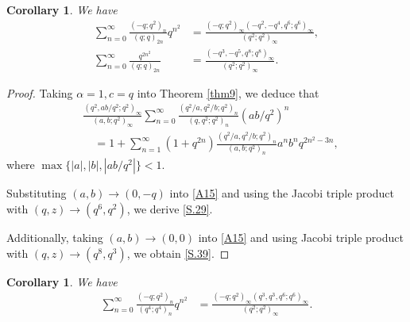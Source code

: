 \documentclass[reqno,12pt]{amsart}
\newtheorem{corollary}[theorem]{Corollary}
\theoremstyle{remark}
\numberwithin{equation}{section}
\begin{document}
\begin{corollary}
We have
\begin{align}
\sum_{n=0}^{\infty}\frac{\left(-q;q^2\right)_n}{\left(q;q\right)_{2n}}q^{n^2}
&=
\frac{\left(-q;q^2\right)_{\infty}\left(-q^2,-q^4,q^6;q^6\right)_{\infty}}
{\left(q^2;q^2\right)_{\infty}},\tag{S.29}\label{S.29}\\
\sum_{n=0}^{\infty}\frac{q^{2n^2}}{\left(q;q\right)_{2n}}
&=
\frac{\left(-q^3,-q^5,q^8;q^8\right)_{\infty}}
{\left(q^2;q^2\right)_{\infty}}.\tag{S.39}\label{S.39}
\end{align}
\end{corollary}
\begin{proof}
Taking $\alpha=1,c=q$ into Theorem \ref{thm9}, we deduce that
\begin{align}
&\frac{\left(q^2,ab/q^2;q^2\right)_{\infty}}
{\left(a,b;q^2\right)_{\infty}}\sum_{n=0}^{\infty}
\frac{\left(q^2/a,q^2/b;q^2\right)_{n}}
{\left(q,q^2;q^2\right)_n}\left(ab/q^2\right)^n\nonumber\\
&\quad=1+\sum_{n=1}^{\infty}\left(1+q^{2n}\right)
\frac{\left(q^2/a,q^2/b;q^2\right)_{n}}{\left(a,b;q^2\right)_n}
a^nb^nq^{2n^2-3n},\label{A15}
\end{align}
where $\max\{|a|,|b|,|ab/q^2|\}<1$.

Substituting $\left(a,b\right)\to\left(0,-q\right)$ into \eqref{A15} and using the Jacobi triple product with $\left(q,z\right)\to\left(q^6,q^2\right)$, we derive \eqref{S.29}.



Additionally, taking $\left(a,b\right)\to\left(0,0\right)$ into  \eqref{A15} and using Jacobi triple product with $\left(q,z\right)\to\left(q^8,q^3\right)$, we obtain \eqref{S.39}.
\end{proof}
\begin{corollary}
We have
\begin{align}
\sum_{n=0}^{\infty}\frac{\left(-q;q^2\right)_{n}}
{\left(q^4;q^4\right)_n}q^{n^2}
&=\frac{\left(-q;q^2\right)_{\infty}\left(q^3,q^3,q^6;q^6\right)_{\infty}}
{\left(q^2;q^2\right)_{\infty}}.\tag{S.25}\label{S.25}
\end{align}
\end{corollary}
\end{document}
